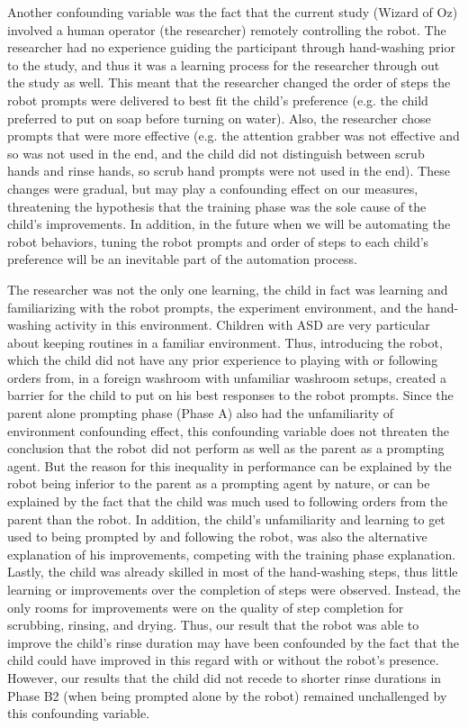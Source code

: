 Another confounding variable was the fact that the current study (Wizard of Oz) involved a human operator (the researcher) remotely controlling the robot.  The researcher had no experience guiding the participant through hand-washing prior to the study, and thus it was a learning process for the researcher through out the study as well.  This meant that the researcher changed the order of steps the robot prompts were delivered to best fit the child's preference (e.g. the child preferred to put on soap before turning on water).  Also, the researcher chose prompts that were more effective (e.g. the attention grabber was not effective and so was not used in the end, and the child did not distinguish between scrub hands and rinse hands, so scrub hand prompts were not used in the end).  These changes were gradual, but may play a confounding effect on our measures, threatening the hypothesis that the training phase was the sole cause of the child's improvements.  In addition, in the future when we will be automating the robot behaviors, tuning the robot prompts and order of steps to each child's preference will be an inevitable part of the automation process.

The researcher was not the only one learning, the child in fact was learning and familiarizing with the robot prompts, the experiment environment, and the hand-washing activity in this environment.  Children with ASD are very particular about keeping routines in a familiar environment.  Thus, introducing the robot, which the child did not have any prior experience to playing with or following orders from, in a foreign washroom with unfamiliar washroom setups, created a barrier for the child to put on his best responses to the robot prompts.  Since the parent alone prompting phase (Phase A) also had the unfamiliarity of environment confounding effect, this confounding variable does not threaten the conclusion that the robot did not perform as well as the parent as a prompting agent.  But the reason for this inequality in performance can be explained by the robot being inferior to the parent as a prompting agent by nature, or can be explained by the fact that the child was much used to following orders from the parent than the robot.  In addition, the child's unfamiliarity and learning to get used to being prompted by and following the robot, was also the alternative explanation of his improvements, competing with the training phase explanation.  Lastly, the child was already skilled in most of the hand-washing steps, thus little learning or improvements over the completion of steps were observed.  Instead, the only rooms for improvements were on the quality of step completion for scrubbing, rinsing, and drying.  Thus, our result that the robot was able to improve the child's rinse duration may have been confounded by the fact that the child could have improved in this regard with or without the robot's presence.  However, our results that the child did not recede to shorter rinse durations in Phase B2 (when being prompted alone by the robot) remained unchallenged by this confounding variable.

